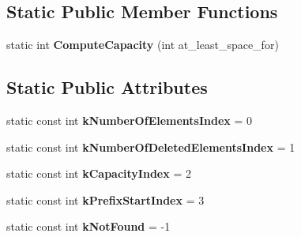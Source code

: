 \subsection*{Static Public Member Functions}
\begin{DoxyCompactItemize}
\item 
static int {\bfseries Compute\+Capacity} (int at\+\_\+least\+\_\+space\+\_\+for)\hypertarget{classv8_1_1internal_1_1_hash_table_base_abc79b7681516b408f235db11d181d158}{}\label{classv8_1_1internal_1_1_hash_table_base_abc79b7681516b408f235db11d181d158}

\end{DoxyCompactItemize}
\subsection*{Static Public Attributes}
\begin{DoxyCompactItemize}
\item 
static const int {\bfseries k\+Number\+Of\+Elements\+Index} = 0\hypertarget{classv8_1_1internal_1_1_hash_table_base_aec11b4e6518d8551f973bc237740cc89}{}\label{classv8_1_1internal_1_1_hash_table_base_aec11b4e6518d8551f973bc237740cc89}

\item 
static const int {\bfseries k\+Number\+Of\+Deleted\+Elements\+Index} = 1\hypertarget{classv8_1_1internal_1_1_hash_table_base_aac8547f563526b42fd0be66a3d6cdd9e}{}\label{classv8_1_1internal_1_1_hash_table_base_aac8547f563526b42fd0be66a3d6cdd9e}

\item 
static const int {\bfseries k\+Capacity\+Index} = 2\hypertarget{classv8_1_1internal_1_1_hash_table_base_a5dbdd64713695ce2688050fe21a9fa27}{}\label{classv8_1_1internal_1_1_hash_table_base_a5dbdd64713695ce2688050fe21a9fa27}

\item 
static const int {\bfseries k\+Prefix\+Start\+Index} = 3\hypertarget{classv8_1_1internal_1_1_hash_table_base_a47b1d536b0124b61b18113aba80896bf}{}\label{classv8_1_1internal_1_1_hash_table_base_a47b1d536b0124b61b18113aba80896bf}

\item 
static const int {\bfseries k\+Not\+Found} = -\/1\hypertarget{classv8_1_1internal_1_1_hash_table_base_a808cd230b60a37067e5a0387e6466daf}{}\label{classv8_1_1internal_1_1_hash_table_base_a808cd230b60a37067e5a0387e6466daf}

\end{DoxyCompactItemize}
